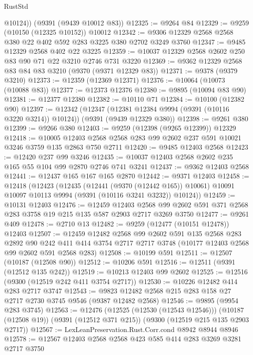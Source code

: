 \begin{lexlean}{RustStd}
\begin{coremodule}
        @10124))
    (@9391 (@9439 @10012 @83))
@12325 := @9264 @84
@12329 := @9259 (@10150 (@12325 @10152)) @10012
@12342 := @9306 @12329 @2568 @2568 @380 @22 @402 @592 @283 @3225 @380 @2702 @3249 @3760
@12347 := @9485 @12329 @2568 @402 @22 @3225
@12359 := @10037 @12329 @2568 @2602 @250 @83 @90 @71 @22 @3210 @2746 @731 @3220
@12369 := @9362 @12329 @2568 @83 @84 @83 @3210 (@9370 (@9371 @12329 @83))
@12371 := @9378 (@9379 @3210)
@12373 := @12359 (@12369 @12371)
@12376 := @10064 (@10073 (@10088 @83))
@12377 := @12373 @12376
@12380 := @9895 (@10094 @83 @90)
@12381 := @12377 @12380
@12382 := @10110 @71
@12384 := @10100 (@12382 @90)
@12397 := @12342
    (@12347 (@12381 @12384 @9994 (@9391 (@10116 @3220 @3214)) @10124))
    (@9391 (@9439 @12329 @380))
@12398 := @9261 @380
@12399 := @9266 @380
@12403 := @9259 (@12398 (@9265 @12399)) @12329
@12418 := @10005
    @12403
    @2568
    @2568
    @283
    @99
    @2602
    @237
    @591
    @10021
    @3246
    @3759
    @135
    @2863
    @750
    @2711
@12420 := @9485 @12403 @2568
@12423 := @12420 @237 @99 @3246
@12435 := @10037 @12403 @2568 @2602 @235 @165 @55 @104 @99 @2870 @2746 @741 @3241
@12437 := @9362 @12403 @2568
@12441 := @12437 @165 @167 @165 @2870
@12442 := @9371 @12403
@12458 := @12418
    (@12423
      (@12435
        (@12441 (@9370 (@12442 @165)) @10061)
        @10091
        @10097
        @10113
        @9994
        (@9391 (@10116 @3241 @3232))
        @10124))
@12459 := @10131 @12403
@12476 := @12459
    @12403
    @2568
    @99
    @2602
    @591
    @371
    @2568
    @283
    @3758
    @19
    @215
    @135
    @587
    @2903
    @2717
    @3269
    @3750
@12477 := @9261 @409
@12478 := @2710 @13
@12482 := @9259 (@12477 (@10151 @12478)) @12403
@12507 := @12459
    @12482
    @2568
    @99
    @2602
    @591
    @135
    @2568
    @283
    @2892
    @90
    @242
    @411
    @414
    @3754
    @2717
    @2717
    @3748
    (@10177 @12403 @2568 @99 @2602 @591 @2568 @283)
@12508 := @10199 @591
@12511 := @12507 (@10187 (@12508 @90))
@12512 := @10206 @591
@12516 := @12511 (@9391 (@12512 @135 @242))
@12519 := @10213 @12403 @99 @2602
@12525 := @12516 (@9300 (@12519 @242 @411 @3754 @2717))
@12530 := @10226 @12482 @414 @283 @2717 @3747
@12543 := @9823 @12482 @2568 @215 @283 @158 @27 @2717 @2730 @3745 @9546 (@9387 @12482 @2568)
@12546 := @9895 (@9954 @283 @3745)
@12563 := @12476
    (@12525 (@12530 (@12543 @12546)))
    (@10187 (@12508 @19))
    (@9391 (@12512 @371 @215))
    (@9300 (@12519 @215 @135 @2903 @2717))
@12567 := LexLeanPreservation.Rust.Corr.cond @8942 @8944 @8946
@12578 := @12567 @12403 @2568 @2568 @423 @585 @414 @283 @3269 @3281 @2717 @3750

\end{coremodule}
\end{lexlean}
